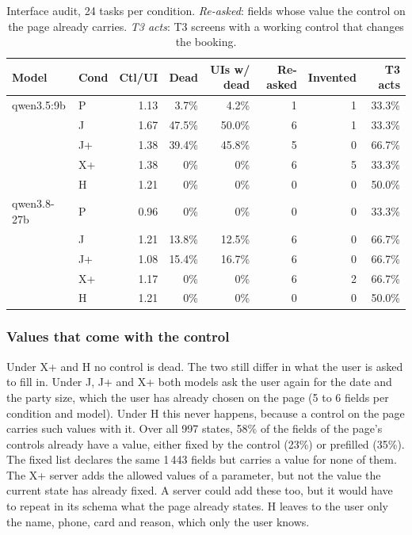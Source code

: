\begin{table}[htbp]
\centering
\small
\caption{Interface audit, 24 tasks per condition. \emph{Re-asked}: fields whose value the control on the page already carries. \emph{T3 acts}: T3 screens with a working control that changes the booking.}
\label{tab:eval:audit}
\begin{tabular}{llrrrrrr}
\hline
Model & Cond & Ctl/UI & Dead & UIs w/ dead & Re-asked & Invented & T3 acts \\
\hline
qwen3.5:9b & P & 1.13 & 3.7\% & 4.2\% & 1 & 1 & 33.3\% \\
 & J & 1.67 & 47.5\% & 50.0\% & 6 & 1 & 33.3\% \\
 & J+ & 1.38 & 39.4\% & 45.8\% & 5 & 0 & 66.7\% \\
 & X+ & 1.38 & 0\% & 0\% & 6 & 5 & 33.3\% \\
 & H & 1.21 & 0\% & 0\% & 0 & 0 & 50.0\% \\
\hline
qwen3.8-27b & P & 0.96 & 0\% & 0\% & 0 & 0 & 33.3\% \\
 & J & 1.21 & 13.8\% & 12.5\% & 6 & 0 & 66.7\% \\
 & J+ & 1.08 & 15.4\% & 16.7\% & 6 & 0 & 66.7\% \\
 & X+ & 1.17 & 0\% & 0\% & 6 & 2 & 66.7\% \\
 & H & 1.21 & 0\% & 0\% & 0 & 0 & 50.0\% \\
\hline
\end{tabular}
\end{table}

\FloatBarrier

\subsubsection{Values that come with the control}\label{sec:results:values}

Under X+ and H no control is dead.
The two still differ in what the user is asked to fill in.
Under J, J+ and X+ both models ask the user again for the date and the party size, which the user has already chosen on the page (5 to 6 fields per condition and model).
Under H this never happens, because a control on the page carries such values with it.
Over all 997 states, 58\% of the fields of the page's controls already have a value, either fixed by the control (23\%) or prefilled (35\%).
The fixed list declares the same 1\,443 fields but carries a value for none of them.
The X+ server adds the allowed values of a parameter, but not the value the current state has already fixed.
A server could add these too, but it would have to repeat in its schema what the page already states.
H leaves to the user only the name, phone, card and reason, which only the user knows.

